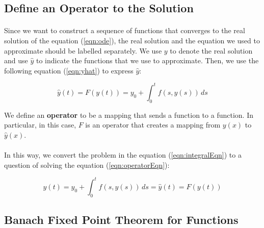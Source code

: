 \documentclass{article}
\theoremstyle{definition}
\theoremstyle{remark}
\begin{document}
\subsection{Define an Operator to the Solution}

\paragraph{  }

Since we want to construct a sequence of functions that converges to the real solution of the equation (\ref{eqn:ode}), the real solution and the equation we used to approximate should be labelled separately. We use $y$ to denote the real solution and use $\hat{y}$ to indicate the functions that we use to approximate. Then, we use the following equation (\ref{eqn:yhat}) to express $\hat{y}$:

\begin{equation}\label{eqn:yhat}
    \hat{y}(t) = F(y(t)) = y_0 + \int_{0}^{t}{f(s,y(s))}\,ds
\end{equation}

We define an \textbf{operator} to be a mapping that sends a function to a function. In particular, in this case, $F$ is an operator that creates a mapping from $y(x)$ to $\hat{y}(x)$.

\paragraph{  }

In this way, we convert the problem in the equation (\ref{eqn:integralEqn}) to a question of solving the equation (\ref{eqn:operatorEqn}):

\begin{equation}\label{eqn:operatorEqn}
    y(t) = y_0 + \int_{0}^{t}{f(s,y(s))}\,ds = \hat{y}(t) = F(y(t))
\end{equation}

\subsection{Banach Fixed Point Theorem for Functions}
\end{document}
